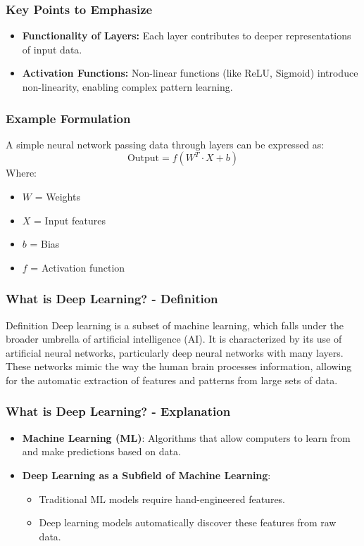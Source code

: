 \documentclass[aspectratio=169]{beamer}
\begin{document}
\begin{frame}[fragile]
    \frametitle{Key Points to Emphasize}
    \begin{itemize}
        \item \textbf{Functionality of Layers:} Each layer contributes to deeper representations of input data.
        \item \textbf{Activation Functions:} Non-linear functions (like ReLU, Sigmoid) introduce non-linearity, enabling complex pattern learning.
    \end{itemize}
\end{frame}

\begin{frame}[fragile]
    \frametitle{Example Formulation}
    A simple neural network passing data through layers can be expressed as:
    \begin{equation}
        \text{Output} = f(W^T \cdot X + b)
    \end{equation}
    Where:
    \begin{itemize}
        \item \( W \) = Weights
        \item \( X \) = Input features
        \item \( b \) = Bias
        \item \( f \) = Activation function
    \end{itemize}
\end{frame}

\begin{frame}[fragile]
    \frametitle{What is Deep Learning? - Definition}
    \begin{block}{Definition}
        Deep learning is a subset of machine learning, which falls under the broader umbrella of artificial intelligence (AI). 
        It is characterized by its use of artificial neural networks, particularly deep neural networks with many layers. 
        These networks mimic the way the human brain processes information, allowing for the automatic extraction of features and patterns from large sets of data.
    \end{block}
\end{frame}

\begin{frame}[fragile]
    \frametitle{What is Deep Learning? - Explanation}
    \begin{itemize}
        \item \textbf{Machine Learning (ML)}: Algorithms that allow computers to learn from and make predictions based on data.
        \item \textbf{Deep Learning as a Subfield of Machine Learning}:
        \begin{itemize}
            \item Traditional ML models require hand-engineered features.
            \item Deep learning models automatically discover these features from raw data.
        \end{itemize}
    \end{itemize}
\end{frame}
\end{document}
